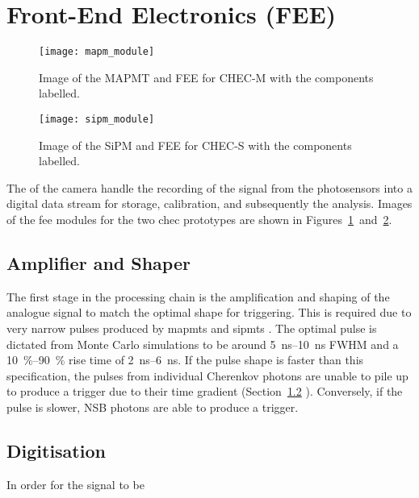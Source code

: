 \section{Front-End Electronics (FEE)}

\begin{figure}
	\centering
    \texttt{[image: mapm\_module]} 
	\caption[Image of the MAPMT and FEE for CHEC-M.]{Image of the MAPMT and FEE for CHEC-M with the components labelled.}
	\label{fig:mapm_module}
\end{figure}

\begin{figure}
	\centering
    \texttt{[image: sipm\_module]} 
	\caption[Image of the SiPM and FEE for CHEC-S.]{Image of the SiPM and FEE for CHEC-S with the components labelled.}
	\label{fig:sipm_module}
\end{figure}

The  of the camera handle the recording of the signal from the photosensors into a digital data stream for storage, calibration, and subsequently the analysis. Images of the \gls{fee} modules for the two \gls{chec} prototypes are shown in Figures~\ref{fig:mapm_module}~and~\ref{fig:sipm_module}. 

\subsection{Amplifier and Shaper}

The first stage in the processing chain is the amplification and shaping of the analogue signal to match the optimal shape for triggering. This is required due to very narrow pulses produced by \glspl{mapmt} and \glspl{sipmt} \cite{Zorn2017}. The optimal pulse is dictated from Monte Carlo simulations to be around \SIrange{5}{10}{ns} FWHM and a \SIrange{10}{90}{\percent} rise time of \SIrange{2}{6}{ns}. If the pulse shape is faster than this specification, the pulses from individual Cherenkov photons are unable to pile up to produce a trigger due to their time gradient (Section~\ref{} ). Conversely, if the pulse is slower, \gls{NSB} photons are able to produce a trigger.

\subsection{Digitisation}



In order for the signal to be 


